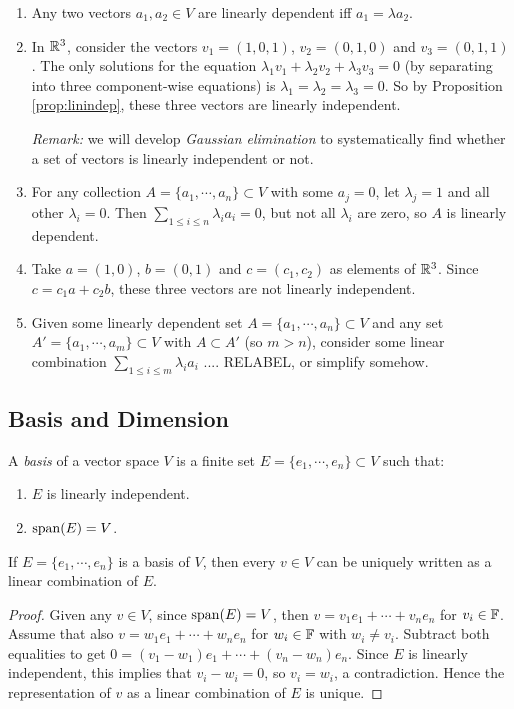 \begin{enumerate}[Ex. A)]
\item Any two vectors $a_1,a_2\in V$ are linearly dependent iff $a_1=\lambda a_2$.

\item In $\mathbb{R}^3$, consider the vectors $v_1=(1,0,1)$, $v_2=(0,1,0)$ and $v_3=(0,1,1)$. The only solutions for the equation $\lambda_1 v_1+\lambda_2 v_2 + \lambda_3 v_3=0$ (by separating into three component-wise equations) is $\lambda_1=\lambda_2=\lambda_3=0$. So by Proposition \ref{prop:linindep}, these three vectors are linearly independent.

\emph{Remark:} we will develop \emph{Gaussian elimination} to systematically find whether a set of vectors is linearly independent or not.

\item For any collection $A=\{a_1,\cdots,a_n\}\subset V$ with some $a_j=0$, let $\lambda_j=1$ and all other $\lambda_i=0$. Then $\sum_{1\leq i\leq n} \lambda_i a_i=0$, but not all $\lambda_i$ are zero, so $A$ is linearly dependent.

\item Take $a=(1,0)$, $b=(0,1)$ and $c=(c_1,c_2)$ as elements of $\mathbb{R}^3$. Since $c=c_1 a + c_2 b$, these three vectors are not linearly independent.

\item Given some linearly dependent set $A=\{a_1,\cdots,a_n\}\subset V$ and any set $A'=\{a_1,\cdots,a_m\}\subset V$ with $A\subset A'$ (so $m>n$), consider some linear combination $\sum_{1\leq i \leq m} \lambda_i a_i$ .... RELABEL, or simplify somehow.
\end{enumerate}

\subsection{Basis and Dimension}
\begin{definition}
  A \emph{basis} of a vector space $V$ is a finite set $E=\{e_1,\cdots,e_n\}\subset V$ such that:
  \begin{enumerate}[1)]
    \item $E$ is linearly independent.
    \item $\operatorname{span}(E)=V$.
  \end{enumerate}
\end{definition}

\begin{proposition}
  If $E=\{e_1,\cdots,e_n\}$ is a basis of $V$, then every $v\in V$ can be uniquely written as a linear combination of $E$.
\end{proposition}
\begin{proof}
  Given any $v\in V$, since $\operatorname{span}(E)=V$, then $v=v_1 e_1 + \cdots + v_n e_n$ for $v_i\in\mathbb{F}$. Assume that also $v=w_1 e_1 + \cdots + w_n e_n$ for $w_i\in\mathbb{F}$ with $w_i\neq v_i$. Subtract both equalities to get $0 = (v_1-w_1)e_1 + \cdots + (v_n-w_n)e_n$. Since $E$ is linearly independent, this implies that $v_i-w_i=0$, so $v_i=w_i$, a contradiction. Hence the representation of $v$ as a linear combination of $E$ is unique.
\end{proof}

